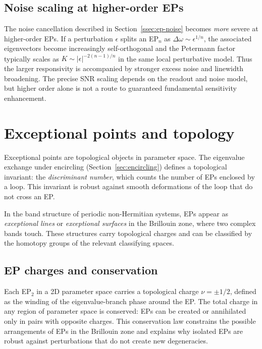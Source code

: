 \subsection{Noise scaling at higher-order EPs}
\label{ssec:higher-ep-noise}

The noise cancellation described in Section~\ref{ssec:ep-noise} becomes
\emph{more} severe at higher-order EPs. If a perturbation $\epsilon$
splits an EP$_n$ as $\Delta\omega\sim \epsilon^{1/n}$, the associated
eigenvectors become increasingly self-orthogonal and the Petermann
factor typically scales as
$K\sim |\epsilon|^{-2(n-1)/n}$ in the same local perturbative model.
Thus the larger responsivity is accompanied by stronger excess noise and
linewidth broadening. The precise SNR scaling depends on the readout and
noise model, but higher order alone is not a route to guaranteed
fundamental sensitivity enhancement.


\section{Exceptional points and topology}
\label{sec:ep-topology}

Exceptional points are topological objects in parameter space. The
eigenvalue exchange under encircling (Section~\ref{sec:encircling})
defines a topological invariant: the \emph{discriminant number}, which
counts the number of EPs enclosed by a loop. This invariant is robust
against smooth deformations of the loop that do not cross an EP.

In the band structure of periodic non-Hermitian systems, EPs appear as
\emph{exceptional lines} or \emph{exceptional surfaces} in the
Brillouin zone, where two complex bands touch. These structures carry
topological charges and can be classified by the homotopy groups of the
relevant classifying spaces.

\subsection{EP charges and conservation}
\label{ssec:ep-charges}

Each EP$_2$ in a 2D parameter space carries a topological charge
$\nu = \pm 1/2$, defined as the winding of the eigenvalue-branch phase
around the EP. The total charge in any region of parameter space is
conserved: EPs can be created or annihilated only in pairs with opposite
charges. This conservation law constrains the possible arrangements of
EPs in the Brillouin zone and explains why isolated EPs are robust
against perturbations that do not create new degeneracies.

